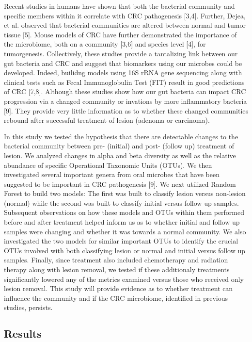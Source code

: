 \documentclass[12pt,]{article}
\begin{document}
Recent studies in humans have shown that both the bacterial community
and specific members within it correlate with CRC pathogenesis
{[}3,4{]}. Further, Dejea, et al. observed that bacterial communities
are altered between normal and tumor tissue {[}5{]}. Mouse models of CRC
have further demonstrated the importance of the microbiome, both on a
community {[}3,6{]} and species level {[}4{]}, for tumorgenesis.
Collectively, these studies provide a tantalizing link between our gut
bacteria and CRC and suggest that biomarkers using our microbes could be
developed. Indeed, builidng models using 16S rRNA gene sequencing along
with clinical tests such as Fecal Immunoglobulin Test (FIT) result in
good predictions of CRC {[}7,8{]}. Although these studies show how our
gut bacteria can impact CRC progression via a changed community or
invations by more inflammatory bacteria {[}9{]}. They provide very
little information as to whether these changed communities rebound after
successful treatment of lesion (adenoma or carcinoma).

In this study we tested the hypothesis that there are detectable changes
to the bacterial community between pre- (initial) and post- (follow up)
treatment of lesion. We analyzed changes in alpha and beta diversity as
well as the relative abundance of specific Operational Taxonomic Units
(OTUs). We then investigated several important genera from oral microbes
that have been suggested to be important in CRC pathogenesis {[}9{]}. We
next utilized Random Forest to build two models: The first was built to
classify lesion versus non-lesion (normal) while the second was built to
classify initial versus follow up samples. Subsequent observations on
how these models and OTUs within them performed before and after
treatment helped inform us as to whether initial and follow up samples
were changing and whether it was towards a normal community. We also
investigated the two models for similar important OTUs to identify the
crucial OTUs involved with both classifying lesion or normal and initial
versus follow up samples. Finally, since treatment also included
chemotherapy and radiation therapy along with lesion removal, we tested
if these additionaly treatments significantly lowered any of the metrics
examined versus those who received only lesion removal. This study will
provide evidence as to whether treatment can influence the community and
if the CRC microbiome, identified in previous studies, persists.

\newpage

\subsection{Results}\label{results}
\end{document}

